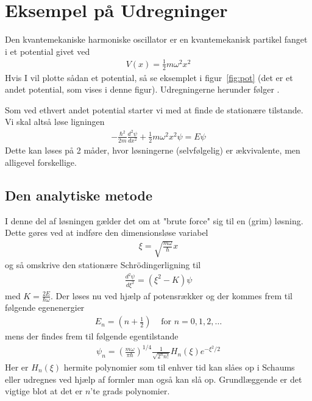\documentclass[danish,a4paper,oneside,onecolumn,article,11pt]{memoir}
\begin{document}
\chapter{Eksempel på Udregninger}
Den kvantemekaniske harmoniske oscillator er en kvantemekanisk
partikel fanget i et potential givet ved
\begin{align}
V(x) = \frac{1}{2} m \omega^2 x^2
\end{align}
Hvis I vil plotte sådan et potential, så se eksemplet i
figur~\ref{fig:pot} (det er et andet potential, som vises i denne
figur). Udregningerne herunder følger \cite{griff}.

Som ved ethvert andet potential starter vi med at finde de stationære tilstande. Vi skal altså løse ligningen
\begin{align}
-\frac{\hbar^2}{2m} \frac{d^2 \psi}{dx^2} + \frac{1}{2}m\omega^2x^2\psi = E\psi
\end{align}
Dette kan løses på 2 måder, hvor løsningerne (selvfølgelig) er
ækvivalente, men alligevel forskellige.

\section{Den analytiske metode}
I denne del af løsningen gælder det om at "brute force" sig til en
(grim) løsning. Dette gøres ved at indføre den dimensionsløse variabel
\begin{align}
\xi = \sqrt{\frac{m\omega}{\hbar}} x
\end{align}
og så omskrive den stationære Schrödingerligning til
\begin{align}
\frac{d^2 \psi}{d \xi^2} = (\xi^2 - K)\psi
\end{align}
med $K = \frac{2E}{\hbar\omega}$. Der løses nu ved hjælp af
potensrækker og der kommes frem til følgende egenenergier
\begin{align}
E_n = \left( n + \frac{1}{2} \right) & \text{ for } n = 0,1,2, \dots
\end{align}
mens der findes frem til følgende egentilstande
\begin{align}
\psi_n = \left( \frac{m\omega}{\pi \hbar} \right)^{1/4}
        \frac{1}{\sqrt{2^n n!}} H_n (\xi) e^{-\xi^2/2}
\end{align}
Her er $H_n(\xi)$ hermite polynomier som til enhver tid kan slåes op i
Schaums \cite{schaums} eller udregnes ved hjælp af formler man også
kan slå op. Grundlæggende er det vigtige blot at det er $n$'te grads
polynomier.
\end{document}

